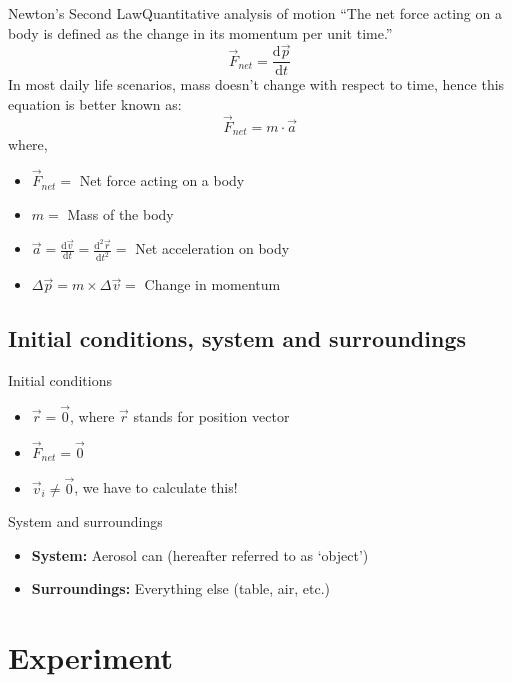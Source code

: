\documentclass{beamer}
\begin{document}
\begin{frame}{Newton's Second Law}{Quantitative analysis of motion}
	``The net force acting on a body is defined as the change in its 
	momentum per unit time.''
	\begin{equation}
	\vec{F}_{net} = \frac{\mathrm{d}\vec{p}}{\mathrm{d}t}
	\end{equation}
	In most daily life scenarios, mass doesn't change with respect to
	time, hence this equation is better known as:
	\[\vec{F}_{net} = m\cdot\vec{a}\]
	where,
	\begin{itemize}
	\item \(\vec{F}_{net} = \) Net force acting on a body
	\item \(m = \) Mass of the body
	\item \(\vec{a} = \frac{\mathrm{d}\vec{v}}{\mathrm{d}t} 
		= \frac{\mathrm{d}^2\vec{r}}{\mathrm{d}t^2} = \) 
		Net acceleration on body	
	\item \(\Delta\vec{p} = m\times\Delta\vec{v} = \)
		Change in momentum
	\end{itemize}
\end{frame}

\subsection{Initial conditions, system and surroundings}
\begin{frame}{Initial conditions}
	\begin{itemize}
	\item \(\vec{r} = \vec{0} \), where \(\vec{r}\) stands for position vector
	\item \(\vec{F}_{net} = \vec{0}\)
	\item \(\vec{v}_i \neq \vec{0} \), we have to calculate this!
	\end{itemize}
\end{frame}

\begin{frame}{System and surroundings}
	\begin{itemize}
	\item \textbf{System:} Aerosol can (hereafter referred to as `object')
	\item \textbf{Surroundings:} Everything else (table, air, etc.)
	\end{itemize}
\end{frame}

\section{Experiment}
\end{document}
